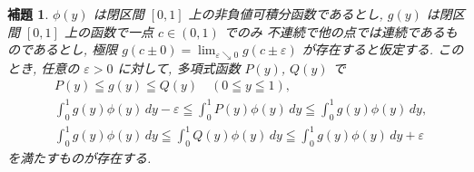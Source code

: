 \documentclass[12pt,twoside]{jarticle}
\newcommand\eps{\varepsilon}
\theoremstyle{jplain}
\newtheorem{lemma}[theorem]{補題}
\theoremstyle{jplain}
\theoremstyle{jplain}
\numberwithin{theorem}{section}
\numberwithin{equation}{section}
\numberwithin{figure}{section}
\numberwithin{table}{section}
\begin{document}
\begin{lemma}
\label{lemma:SW}
$\phi(y)$ は閉区間 $[0,1]$ 上の非負値可積分函数であるとし,
$g(y)$ は閉区間 $[0,1]$ 上の函数で一点 $c\in(0,1)$ でのみ
不連続で他の点では連続であるものであるとし,
極限 $g(c\pm 0)=\lim_{\eps\searrow 0}g(c\pm\eps)$ が存在すると仮定する.
このとき, 任意の $\eps>0$ に対して,  多項式函数 $P(y)$, $Q(y)$ で
\begin{align*}
&
P(y)\leqq g(y)\leqq Q(y) \quad (0\leqq y\leqq 1),
\\ &
\int_0^1 g(y)\phi(y)\,dy-\eps
\leqq
\int_0^1 P(y)\phi(y)\,dy
\leqq
\int_0^1 g(y)\phi(y)\,dy,
\\ &
\int_0^1 g(y)\phi(y)\,dy
\leqq
\int_0^1 Q(y)\phi(y)\,dy
\leqq
\int_0^1 g(y)\phi(y)\,dy+\eps
\end{align*}
を満たすものが存在する.
\end{lemma}
\end{document}
